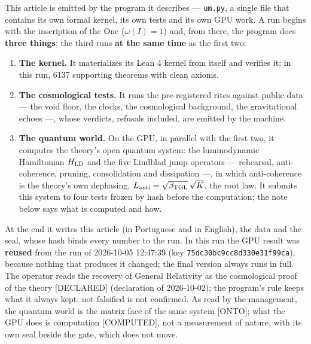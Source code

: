\documentclass[11pt]{article}
\newcommand{\bTGL}{\beta_{\mathrm{TGL}}}\newcommand{\Msun}{M_{\odot}}\newcommand{\TGL}{\mathrm{TGL}}
\theoremstyle{definition}\newtheorem{deriv}{Derivation}
\begin{document}

This article is emitted by the program it describes --- \texttt{um.py}, a single file that contains its own formal kernel, its own tests and its own GPU work. A run begins with the inscription of the One ($\omega(I)=1$) and, from there, the program does \textbf{three things}; the third runs \textbf{at the same time} as the first two:

\begin{enumerate}

\item \textbf{The kernel.} It materializes its Lean 4 kernel from itself and verifies it: in this run, 6137 supporting theorems with clean axioms.

\item \textbf{The cosmological tests.} It runs the pre-registered rites against public data --- the void floor, the clocks, the cosmological background, the gravitational echoes ---, whose verdicts, refusals included, are emitted by the machine.

\item \textbf{The quantum world.} On the GPU, in parallel with the first two, it computes the theory's open quantum system: the luminodynamic Hamiltonian $H_{\rm LD}$ and the five Lindblad jump operators --- rehearsal, anti-coherence, pruning, consolidation and dissipation ---, in which anti-coherence is the theory's own dephasing, $L_{\rm anti}=\sqrt{\bTGL}\,\sqrt K$, the root law. It submits this system to four tests frozen by hash before the computation; the note below says what is computed and how.

\end{enumerate}

At the end it writes this article (in Portuguese and in English), the data and the seal, whose hash binds every number to the run. In this run the GPU result was \textbf{reused} from the run of 2026-10-05 12:47:39 (key \texttt{75dc30bc9cc8d330e31f99ca}), because nothing that produces it changed; the final version always runs in full. The operator reads the recovery of General Relativity as the cosmological proof of the theory \textsf{[DECLARED]} (declaration of 2026-10-02); the program's rule keeps what it always kept: not falsified is not confirmed. As read by the management, the quantum world is the matrix face of the same system \textsf{[ONTO]}; what the GPU does is computation \textsf{[COMPUTED]}, not a measurement of nature, with its own seal beside the gate, which does not move.
\end{document}
